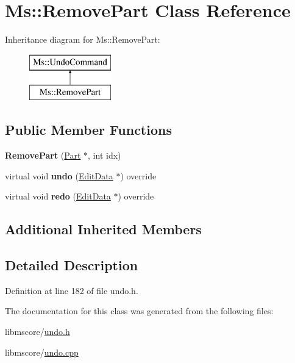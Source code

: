\hypertarget{class_ms_1_1_remove_part}{}\section{Ms\+:\+:Remove\+Part Class Reference}
\label{class_ms_1_1_remove_part}
Inheritance diagram for Ms\+:\+:Remove\+Part\+:\begin{figure}[H]
\begin{center}
\leavevmode
\includegraphics[height=2.000000cm]{class_ms_1_1_remove_part}
\end{center}
\end{figure}
\subsection*{Public Member Functions}
\begin{DoxyCompactItemize}
\item 
\mbox{\label{class_ms_1_1_remove_part_aaedb202ee748c018516cbbea41246396}} 
{\bfseries Remove\+Part} (\hyperlink{class_ms_1_1_part}{Part} $\ast$, int idx)
\item 
\mbox{\label{class_ms_1_1_remove_part_ab523c10e85981d9e2a3d0dd71a29d956}} 
virtual void {\bfseries undo} (\hyperlink{class_ms_1_1_edit_data}{Edit\+Data} $\ast$) override
\item 
\mbox{\label{class_ms_1_1_remove_part_a8f374515015f35f4da89d91ab7b5297a}} 
virtual void {\bfseries redo} (\hyperlink{class_ms_1_1_edit_data}{Edit\+Data} $\ast$) override
\end{DoxyCompactItemize}
\subsection*{Additional Inherited Members}


\subsection{Detailed Description}


Definition at line 182 of file undo.\+h.



The documentation for this class was generated from the following files\+:\begin{DoxyCompactItemize}
\item 
libmscore/\hyperlink{undo_8h}{undo.\+h}\item 
libmscore/\hyperlink{undo_8cpp}{undo.\+cpp}\end{DoxyCompactItemize}
